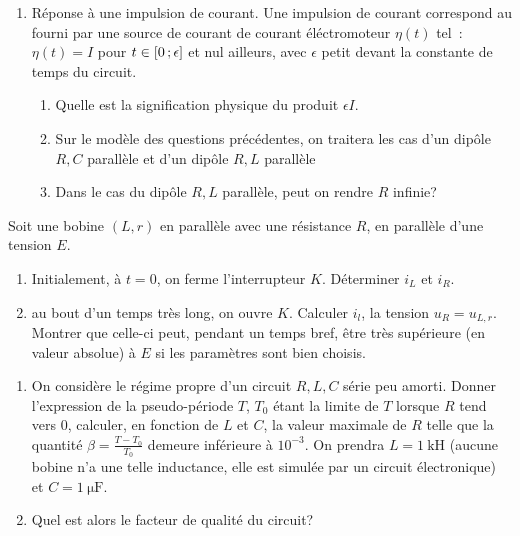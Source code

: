 \begin{exercice}
\begin{enumerate}
    \item Réponse à une impulsion de courant. Une impulsion de courant 
      correspond au fourni par une source de courant de courant éléctromoteur 
      \(\eta(t)\) tel~: \(\eta(t) = I\) pour \(t \in 
      \left[ 0 \, ;  \epsilon \right]\) et nul ailleurs, avec \(\epsilon\) petit 
      devant la constante de temps du circuit.
      \begin{enumerate}
        \item Quelle est la signification physique du produit \(\epsilon I\).
        \item Sur le modèle des questions précédentes, on traitera les cas d'un 
          dipôle \(R,C\) parallèle et d'un dipôle \(R, L\) parallèle
        \item Dans le cas du dipôle \(R, L\) parallèle, peut on rendre \(R\) 
          infinie?
      \end{enumerate}
  \end{enumerate}
\end{exercice}%
\begin{exercice}%
  Soit une bobine \((L, r)\) en parallèle avec une résistance \(R\), en 
  parallèle d'une tension \(E\).
  \begin{enumerate}
    \item Initialement, à \(t=0\), on ferme l'interrupteur \(K\). Déterminer 
      \(i_L\) et \(i_R\).
    \item au bout d'un temps très long, on ouvre \(K\). Calculer \(i_l\), la 
      tension \(u_R = u_{L, r}\). Montrer que celle-ci peut, pendant un temps 
      bref, être très supérieure (en valeur absolue) à \(E\) si les paramètres 
      sont bien choisis.
  \end{enumerate}
\end{exercice}%
\begin{exercice}%
  \begin{enumerate}
    \item On considère le régime propre d'un circuit \(R, L, C\) série peu 
      amorti. Donner l'expression de la pseudo-période \(T\), \(T_0\) étant la 
      limite de \(T\) lorsque \(R\) tend vers 0, calculer, en fonction de \(L\) 
      et \(C\), la valeur maximale de \(R\) telle que la quantité \(\beta = 
      \frac{T-T_0}{T_0}\) demeure inférieure à \(10^{-3}\). On prendra \(L = 
      \SI{1}{\kilo\henry}\) (aucune bobine n'a une telle inductance, elle est 
      simulée par un circuit électronique) et \(C=\SI{1}{\micro\farad}\).
    \item Quel est alors le facteur de qualité du circuit?
  \end{enumerate}
\end{exercice}%
